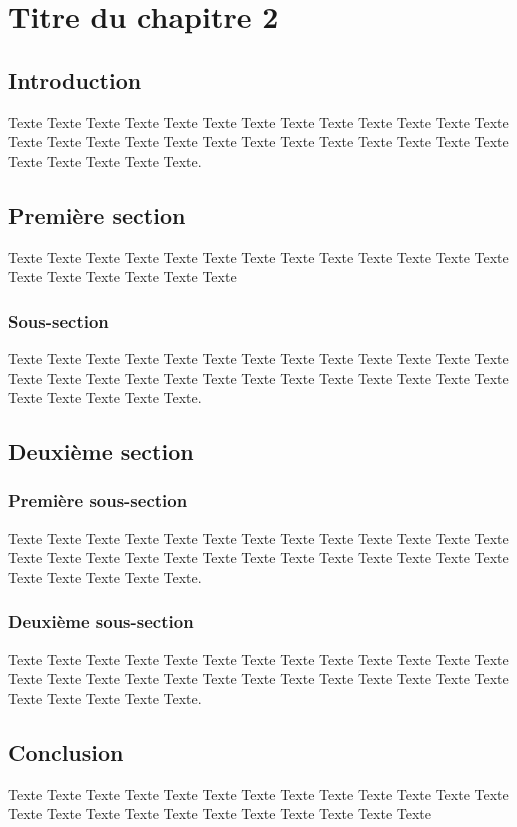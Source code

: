 \chapter{Titre du chapitre 2}
	
\section{Introduction} 

Texte Texte Texte Texte Texte Texte Texte Texte Texte Texte Texte Texte Texte Texte Texte Texte Texte Texte Texte Texte Texte Texte Texte Texte Texte Texte Texte Texte Texte Texte Texte.

\section{Première section}

Texte Texte Texte Texte Texte Texte Texte Texte Texte Texte Texte Texte Texte Texte Texte Texte Texte Texte Texte

\subsection{Sous-section}

Texte Texte Texte Texte Texte Texte Texte Texte Texte Texte Texte Texte Texte Texte Texte Texte Texte Texte Texte Texte Texte Texte Texte Texte Texte Texte Texte Texte Texte Texte Texte.

\section{Deuxième section}

\subsection{Première sous-section}

Texte Texte Texte Texte Texte Texte Texte Texte Texte Texte Texte Texte Texte Texte Texte Texte Texte Texte Texte Texte Texte Texte Texte Texte Texte Texte Texte Texte Texte Texte Texte.

\subsection{Deuxième sous-section}

Texte Texte Texte Texte Texte Texte Texte Texte Texte Texte Texte Texte Texte Texte Texte Texte Texte Texte Texte Texte Texte Texte Texte Texte Texte Texte Texte Texte Texte Texte Texte.

\section{Conclusion} 

Texte Texte Texte Texte Texte Texte Texte Texte Texte Texte Texte Texte Texte Texte Texte Texte Texte Texte Texte Texte Texte Texte Texte Texte